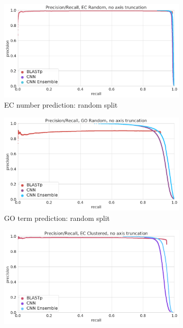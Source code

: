 \begin{figure}[ht] 
  \begin{subfigure}[b]{0.5\linewidth}
    \centering
    \includegraphics[width=0.9\linewidth]{prc_ec_random_unzoomed.png}
    \caption{EC number prediction: random split} 
    \label{fig:without_ensemble:a} 
    \vspace{4ex}
  \end{subfigure}%
  \begin{subfigure}[b]{0.5\linewidth}
    \centering
    \includegraphics[width=0.9\linewidth]{prc_go_random_unzoomed.png}
    \caption{GO term prediction: random split} 
    \label{fig:without_ensemble:b} 
    \vspace{4ex}
  \end{subfigure} 
  \begin{subfigure}[b]{0.5\linewidth}
    \centering
    \includegraphics[width=0.9\linewidth]{prc_ec_clustered_unzoomed.png}

\end{subfigure}
\end{figure}
